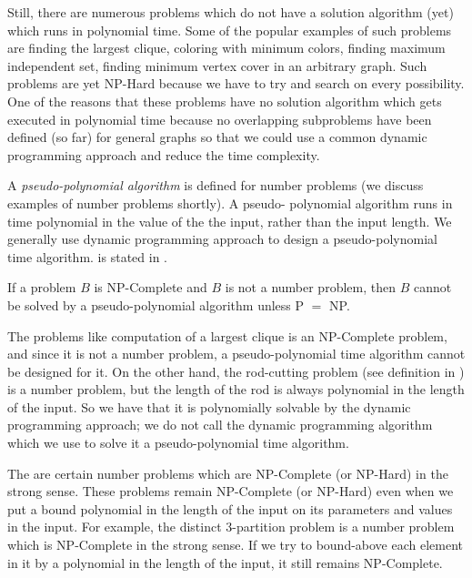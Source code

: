 Still, there are numerous problems which do not have a solution algorithm (yet) which runs in polynomial time. Some of the popular examples of such problems are finding the largest clique, coloring with minimum colors, finding maximum independent set, finding minimum vertex cover in an arbitrary graph. Such problems are yet NP-Hard because we have to try and search on every possibility. One of the reasons that these problems have no solution algorithm which gets executed in polynomial time because no overlapping subproblems have been defined (so far) for general graphs so that we could use a common dynamic programming approach and reduce the time complexity.

A \textit{pseudo-polynomial algorithm} is defined for number problems (we discuss examples of number problems shortly). A pseudo- polynomial algorithm runs in time polynomial in the value of the the input, rather than the input length. We generally use dynamic programming approach to design a pseudo-polynomial time algorithm.  is stated in \cite{Garey1979}.

\begin{observation}\label{obsertation:number-problem-polynomially-solvable}
    If a problem $B$ is NP-Complete and $B$ is not a number problem, then $B$ cannot be solved by a pseudo-polynomial algorithm unless P $=$ NP.
\end{observation}

The problems like computation of a largest clique is an NP-Complete problem, and since it is not a number problem, a pseudo-polynomial time algorithm cannot be designed for it. On the other hand, the rod-cutting problem (see definition in ) is a number problem, but the length of the rod is always polynomial in the length of the input. So we have that it is polynomially solvable by the dynamic programming approach; we do not call the dynamic programming algorithm which we use to solve it a pseudo-polynomial time algorithm.

The are certain number problems which are NP-Complete (or NP-Hard) in the strong sense. These problems remain NP-Complete (or NP-Hard) even when we put a bound polynomial in the length of the input on its parameters and values in the input. For example, the distinct 3-partition problem is a number problem which is NP-Complete in the strong sense. If we try to bound-above each element in it by a polynomial in the length of the input, it still remains NP-Complete.

